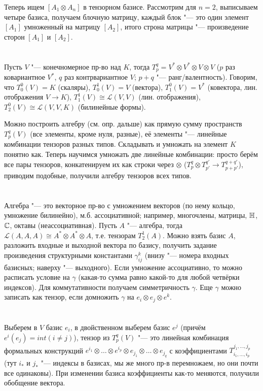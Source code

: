 Теперь ищем $[A_1 \otimes A_n]$ в тензорном базисе.
Рассмотрим для $n=2$, выписываем четыре базиса, получаем блочную матрицу, каждый блок "--- это один элемент $[A_1]$ умноженный
на матрицу $[A_2]$, итого строна матрицы "--- произведение сторон $[A_1]$ и $[A_2]$.

\section{} %
Пусть $V$ "--- конечномерное пр-во над $K$, тогда $T_p^q = V^*\otimes V^*\otimes V \otimes V$ ($p$ раз ковариантное $V^*$, $q$ раз контрвариантное $V$; $p+q$ "--- ранг/валентность).
Говорим, что $T_0^0(V)=K$ (скаляры), $T_0^1(V)=V$ (вектора), $T_1^0(V)=V^*$ (ковектора, лин. отображения $V \to K$), $T_1^1(V) \cong \mathcal L (V, V)$ (лин. отображения),
$T_2^0(V) \cong \mathcal L(V, V, K)$ (билинейные формы).

Можно построить алгебру (см. опр. дальше) как прямую сумму пространств $T_p^q(V)$ (все элементы, кроме нуля, разные),
её элементы "--- линейные комбинации тензоров разных типов.
Складывать и умножать на элемент $K$ понятно как.
Теперь научимся умножать две линейные комбинации: просто берём все пары тензоров, конкатенируем их как строки через $\otimes$ ($T_p^q \otimes T_{p'}^{q'} \to T_{p+p'}^{q+q'}$),
приводим подобные, получили алгебру тензоров всех типов.

\section{} %
Алгебра "--- это векторное пр-во с умножением векторов (по нему кольцо, умножение билинейно), м.б. ассоциативной;
например, многочлены, матрицы, $\mathbb{H}$, $\mathbb{C}$, октавы (неассоциативная).
Пусть $A$ "--- алгебра, тогда $\mathcal L(A, A, A) \cong A^* \otimes A^* \otimes A$, т.е. тензорам $T_2^1(A)$.
Можно взять базис $A$, разложить входные и выходной вектора по базису, получить задание произведения структурными
константами $\gamma_{ij}^k$ (внизу "--- номера входных базисных; наверху "--- выходного).
Если умножение ассоциативно, то можно расписать условие на $\gamma$ (какая-то сумма равно какой-то для любой четвёрки индексов).
Для коммутативности получаем симметричность $\gamma$.
Еще $\gamma$ можно записать как тензор, если домножить $\gamma$ на $e_i\otimes e_j \otimes e^k$.

\section{} %
Выберем в $V$ базис $e_i$, в двойственном выберем базис $e^j$ (причём $e^i(e_j)=int(i \neq j)$), тензор из $T_p^q(V)$ "--- это линейная
комбинация формальных конструкций $e^{i_1}\otimes\dots\otimes e^{i_p}\otimes e_{j_1} \otimes\dots\otimes e_{j_q}$ с коэффициентами $T_{i_1,\dots,i_p}^{j_1,\dots,j_p}$
(тут $i_*$ и $j_*$ "--- индексы в базисах, мы же много пр-в перемножаем, но они почти все одинаковы).
При изменении базиса коэффициенты как-то меняются, получили обобщение вектора.


